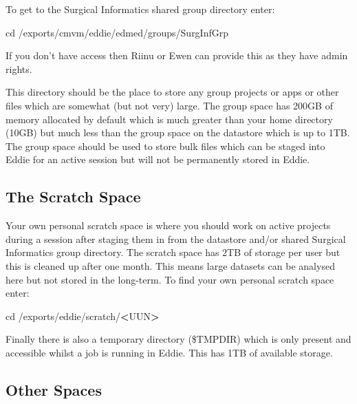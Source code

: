 \documentclass[
]{book}
\newenvironment{Shaded}{\begin{snugshade}}{\end{snugshade}}
\newcommand{\BuiltInTok}[1]{#1}
\newcommand{\NormalTok}[1]{#1}
\newcommand{\OperatorTok}[1]{\textcolor[rgb]{0.81,0.36,0.00}{\textbf{#1}}}
\begin{document}
To get to the Surgical Informatics shared group directory enter:

\begin{Shaded}
\begin{Highlighting}[]
\BuiltInTok{cd}\NormalTok{ /exports/cmvm/eddie/edmed/groups/SurgInfGrp}
\end{Highlighting}
\end{Shaded}

If you don't have access then Riinu or Ewen can provide this as they have admin rights.

This directory should be the place to store any group projects or apps or other files which are somewhat (but not very) large. The group space has 200GB of memory allocated by default which is much greater than your home directory (10GB) but much less than the group space on the datastore which is up to 1TB. The group space should be used to store bulk files which can be staged into Eddie for an active session but will not be permanently stored in Eddie.

\hypertarget{the-scratch-space}{%
\subsection{The Scratch Space}\label{the-scratch-space}}

Your own personal scratch space is where you should work on active projects during a session after staging them in from the datastore and/or shared Surgical Informatics group directory. The scratch space has 2TB of storage per user but this is cleaned up after one month. This means large datasets can be analysed here but not stored in the long-term. To find your own personal scratch space enter:

\begin{Shaded}
\begin{Highlighting}[]
\BuiltInTok{cd}\NormalTok{ /exports/eddie/scratch/}\OperatorTok{<}\NormalTok{UUN}\OperatorTok{>}
\end{Highlighting}
\end{Shaded}

Finally there is also a temporary directory (\$TMPDIR) which is only present and accessible whilst a job is running in Eddie. This has 1TB of available storage.

\hypertarget{other-spaces}{%
\subsection{Other Spaces}\label{other-spaces}}
\end{document}
